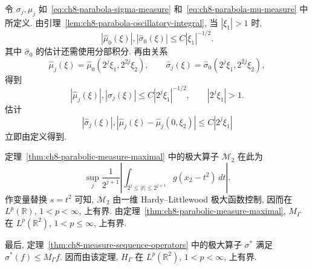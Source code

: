\begin{Proof}
令 $\sigma_j,\mu_j$ 如~\eqref{eq:ch8-parabola-sigma-measure} 和~\eqref{eq:ch8-parabola-mu-measure} 中所定义. 由引理~\ref{lem:ch8-parabola-oscillatory-integral}, 当 $|\xi_1|>1$ 时,
\[
 |\widehat\mu_0(\xi)|,|\widehat\sigma_0(\xi)|
 \le C|\xi_1|^{-1/2}.
\]
其中 $\widehat\sigma_0$ 的估计还需使用分部积分. 再由关系
\[
 \widehat\mu_j(\xi)=\widehat\mu_0(2^j\xi_1,2^{2j}\xi_2),
 \qquad
 \widehat\sigma_j(\xi)=\widehat\sigma_0(2^j\xi_1,2^{2j}\xi_2),
\]
得到
\[
 |\widehat\mu_j(\xi)|,|\widehat\sigma_j(\xi)|
 \le C|2^j\xi_1|^{-1/2},
 \qquad |2^j\xi_1|>1.
\]
估计
\[
 |\widehat\sigma_j(\xi)|,
 |\widehat\mu_j(\xi)-\widehat\mu_j(0,\xi_2)|
 \le C|2^j\xi_1|
\]
立即由定义得到.

定理~\ref{thm:ch8-parabolic-measure-maximal} 中的极大算子 $\mathcal M_2$ 在此为
\[
 \sup_j\frac1{2^{j+1}}
 \left|\int_{2^j\le|t|\le2^{j+1}}g(x_2-t^2)\,dt\right|.
\]
作变量替换 $s=t^2$ 可知, $\mathcal M_2$ 由一维 Hardy--Littlewood 极大函数控制, 因而在 $L^p(\mathbb R)$, $1<p<\infty$, 上有界. 由定理~\ref{thm:ch8-parabolic-measure-maximal}, $M_\Gamma$ 在 $L^p(\mathbb R^2)$, $1<p\le\infty$, 上有界.

最后, 定理~\ref{thm:ch8-measure-sequence-operators} 中的极大算子 $\sigma^*$ 满足 $\sigma^*(f)\le M_\Gamma f$. 因而由该定理, $H_\Gamma$ 在 $L^p(\mathbb R^2)$, $1<p<\infty$, 上有界.
\end{Proof}
